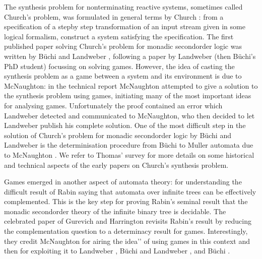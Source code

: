 \documentclass[letterpaper,10pt,english]{sphinxmanual}
\begin{document}
The synthesis problem for non\sphinxhyphen{}terminating reactive systems, sometimes called Church’s problem,
was formulated in general terms by Church :
from a specification of a step\sphinxhyphen{}by step transformation of an input stream given in some logical formalism,
construct a system satisfying the specification.
The first published paper solving Church’s problem for monadic second\sphinxhyphen{}order logic was written by Büchi and Landweber , following a paper by Landweber  (then Büchi’s PhD student) focussing on solving games.
However, the idea of casting the synthesis problem as a game between a system and its environment is due to McNaughton:
in the technical report  McNaughton attempted to give a solution to the synthesis problem using games, initiating many of the most important ideas for analysing games.
Unfortunately the proof contained an error which Landweber detected and communicated to McNaughton,
who then decided to let Landweber publish his complete solution.
One of the most difficult step in the solution of Church’s problem for monadic second\sphinxhyphen{}order logic by Büchi and Landweber  is the determinisation procedure from Büchi to Muller automata due to McNaughton .
We refer to Thomas’ survey  for more details on some historical and technical aspects of the early papers on Church’s synthesis problem.

Games emerged in another aspect of automata theory: for understanding the difficult result of Rabin  saying that automata over infinite trees can be effectively complemented.
This is the key step for proving Rabin’s seminal result that the monadic second\sphinxhyphen{}order theory of the infinite binary tree is decidable.
The celebrated paper of Gurevich and Harrington  revisits Rabin’s result by reducing the complementation question to a determinacy result for games. Interestingly, they credit McNaughton for \textasciigrave{}\textasciigrave{}airing the idea’’ of using games in this context and then for exploiting it to Landweber , Büchi and Landweber , and Büchi .
\end{document}
